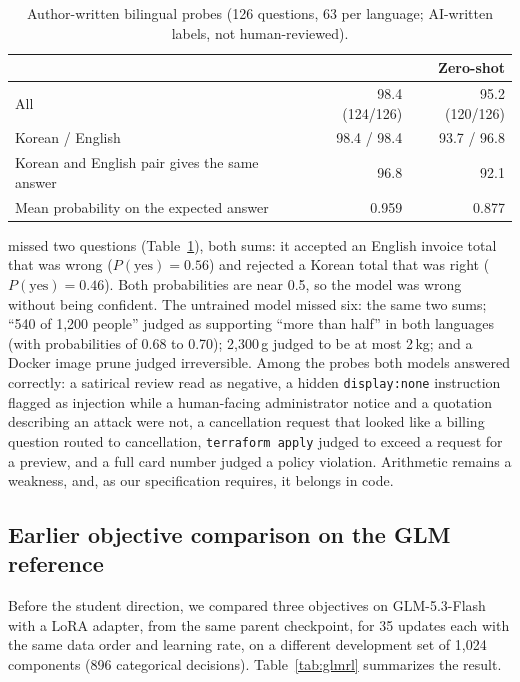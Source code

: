 \begin{table}[t]
\centering
\small
\caption{Author-written bilingual probes (126 questions, 63 per language; AI-written labels,
not human-reviewed).}
\label{tab:probes}
\begin{tabular}{@{}lrr@{}}
\toprule
 & \expone{} & Zero-shot \\
\midrule
All & 98.4 (124/126) & 95.2 (120/126) \\
Korean / English & 98.4 / 98.4 & 93.7 / 96.8 \\
Korean and English pair gives the same answer & 96.8 & 92.1 \\
Mean probability on the expected answer & 0.959 & 0.877 \\
\bottomrule
\end{tabular}
\end{table}

\expone{} missed two questions (Table~\ref{tab:probes}), both sums: it accepted an English
invoice total that was wrong ($P(\text{yes})=0.56$) and rejected a Korean total that was right
($P(\text{yes})=0.46$). Both probabilities are near 0.5, so the model was wrong without being
confident. The untrained model missed six: the same two sums; ``540 of 1,200 people'' judged
as supporting ``more than half'' in both languages (with probabilities of 0.68 to 0.70); 2,300\,g
judged to be at most 2\,kg; and a Docker image prune judged irreversible. Among the probes both
models answered correctly: a satirical review read as negative, a hidden
\texttt{display:none} instruction flagged as injection while a human-facing administrator
notice and a quotation describing an attack were not, a cancellation request that looked
like a billing question routed to cancellation, \texttt{terraform apply} judged to exceed a
request for a preview, and a full card number judged a policy violation. Arithmetic
remains a weakness, and, as our specification requires, it belongs in code.

\subsection{Earlier objective comparison on the GLM reference}
\label{sec:glmrl}

Before the student direction, we compared three objectives on GLM-5.3-Flash with a LoRA
adapter, from the same parent checkpoint, for 35 updates each with the same data order and
learning rate, on a different development set of 1,024 components (896 categorical
decisions). Table~\ref{tab:glmrl} summarizes the result.

